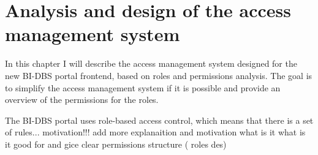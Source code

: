 \chapter{Analysis and design of the access management system} In this chapter I will describe the access management system designed for the new BI-DBS portal frontend, based on roles and permissions analysis. The goal is to simplify the access management system if it is possible and provide an overview of the permissions for the roles.

The BI-DBS portal uses role-based access control, which means that there is a set of rules... motivation!!! add more explanaition and motivation
what is it 
what is it good for
and gice clear permissions structure ( roles des)







